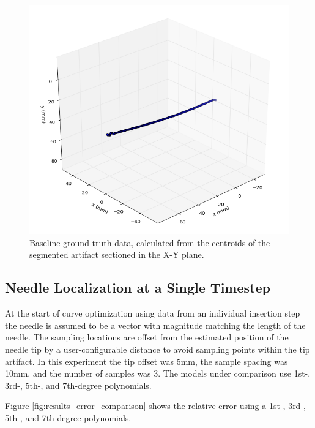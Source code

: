 \begin{figure}[h]
\includegraphics[width=1.0\textwidth]{Fig/chap5/neutral_axis_2001_b.png}
\caption{Baseline ground truth data, calculated from the centroids of the segmented artifact sectioned in the X-Y plane.}
\label{fig:ground_truth_2001}
\end{figure}

\subsection{Needle Localization at a Single Timestep}
\label{sec:mri_single_timestep}
At the start of curve optimization using data from an individual insertion step the needle is assumed to be a vector with magnitude matching the length of the needle. The sampling locations are offset from the estimated position of the needle tip by a user-configurable distance to avoid sampling points within the tip artifact. In this experiment the tip offset was 5mm, the sample spacing was 10mm, and the number of samples was 3. The models under comparison use 1st-, 3rd-, 5th-, and 7th-degree polynomials.

Figure \ref{fig:results_error_comparison} shows the relative error using a 1st-, 3rd-, 5th-, and 7th-degree polynomials. 

